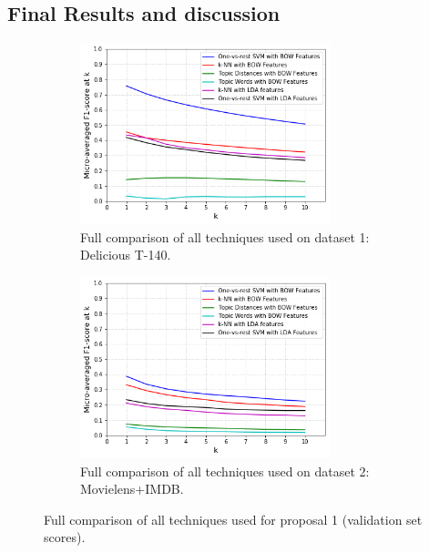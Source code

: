 \subsection{Final Results and discussion}\label{sub:final_results_prop_1}

\begin{figure}[H]
    \begin{subfigure}{0.5\textwidth}
        \centering
    \includegraphics[width=0.8\textwidth]{chapters/05_experiments/images/full-comparison-dataset-1.png}
    \caption{Full comparison of all techniques used on dataset 1: Delicious T-140.}
    \label{fig:full_comparison_dataset_1}
    \end{subfigure}
    \begin{subfigure}{0.5\textwidth}
        \centering
    \includegraphics[width=0.8\textwidth]{chapters/05_experiments/images/full-comparison-dataset-2.png}
    \caption{Full comparison of all techniques used on dataset 2: Movielens+IMDB.}
    \label{fig:full_comparison_dataset_2}
    \end{subfigure}
    \caption{Full comparison of all techniques used for proposal 1 (validation set scores).}
\end{figure}


